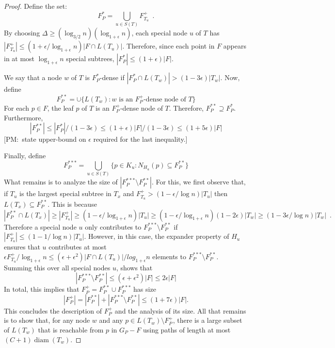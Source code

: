 \documentclass{patmorin}
\newcommand{\note}[2]{{\color{red}[#1:~#2]}}
\DeclareMathOperator{\diam}{diam}
\begin{document}
\begin{proof}
  Define the set:
  \[  
    F^*_P = \bigcup_{u\in S(T)} F^+_{T_u} \enspace .
  \]
  By choosing $\Delta \ge (\log_{3/2} n)(\log_{1+\epsilon}
  n)$, each special node $u$ of $T$ has $|F^+_{T_u}|\le
  (1+\epsilon/\log_{1+\epsilon} n)|F\cap L(T_u)|$. Therefore, since
  each point in $F$ appears in at most $\log_{1+\epsilon} n$ special
  subtrees, $|F^*_P|\le (1+\epsilon)|F|$.

  We say that a node $w$ of $T$ is $F^*_P$-dense if $|F^*_P \cap L(T_w)| >
  (1-3\epsilon)|T_w|$.  Now, define
  \[  
     F^{**}_P = \cup\{ L(T_w) : \text{$w$ is an $F^+_P$-dense node of $T$} \}
  \]
  For each $p\in F$, the leaf $p$ of $T$ is an $F^+_P$-dense node of
  $T$. Therefore, $F^{**}_P\supseteq F^{*}_P$.  Furthermore,
  \[
      |F^{**}_P| \le |F^*_P|/(1-3\epsilon) \le (1+\epsilon)|F|/(1-3\epsilon) \le (1+5\epsilon)|F|
  \]
  \note{PM}{state upper-bound on $\epsilon$ required for the last inequality.}

  Finally, define 
  \[  F^{***}_P = \bigcup_{u\in S(T)} \{p \in K_u : N_{H_u}(p)\subseteq F^{**}_P \} \]
  What remains is to analyze the size of $|F^{***}_P\setminus F^{**}_P|$.
  For this, we first observe that, if $T_u$ is the largest special
  subtree in $T_x$ and $F^+_{T_u} > (1-\epsilon/\log n)|T_u|$ then
  $L(T_x)\subseteq F^{**}_P$.  This is because
  \[
     |F^{**}_P\cap L(T_x)| 
  \ge  
     |F^+_{T_u}|
  \ge  
     (1-\epsilon/\log_{1+\epsilon} n)|T_u|
  \ge  
     (1-\epsilon/\log_{1+\epsilon} n)(1-2\epsilon)|T_w|
  \ge  
     (1-3\epsilon/\log n)|T_w| \enspace .
  \]
  Therefore a special node $u$ only contributes to $F^{***}_P\setminus
  F^{**}_P$ if $|F^+_{T_u}| \le (1-1/\log n)|T_u|$.  However,
  in this case, the expander property of $H_u$ ensures that $u$
  contributes at most $\epsilon F^+_{T_u}/\log_{1+\epsilon} n\le
  (\epsilon+\epsilon^2)|F\cap L(T_u)|/log_{1+\epsilon} n$ elements to
  $F^{***}_P\setminus F^{**}_P$.  Summing this over all special nodes $u$,
  shows that
  \[
     |F^{***}_P\setminus F^{**}_P| \le (\epsilon+\epsilon^2)|F| \le 2\epsilon|F|
  \]
  In total, this implies that $F^+_P = F^{**}_P\cup F^{***}_P$ has size
  \[ |F^+_P| = |F^{**}_P| + |F^{***}_P\setminus F^{**}_P|\le (1+7\epsilon)|F| .
  \]  
  This concludes the description of $F^+_P$ and the analysis of its
  size.  All that remains is to show that, for any node $w$ and any
  $p\in L(T_w)\setminus F^+_P$, there is a large subset of $L(T_w)$
  that is reachable from $p$ in $G_P-F$ using paths of length at most
  $(C+1)\diam(T_w)$.


\end{proof}
\end{document}

